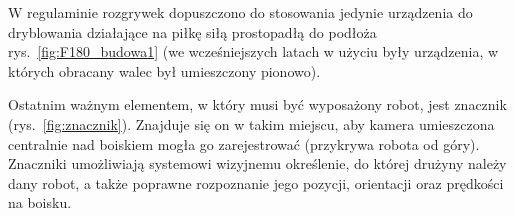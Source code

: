 	W regulaminie rozgrywek dopuszczono do stosowania jedynie urządzenia do dryblowania działające na piłkę siłą prostopadłą do podłoża rys.~\ref{fig:F180_budowa1} (we wcześniejszych latach
	w użyciu były  urządzenia, w których obracany walec był umieszczony pionowo).

	Ostatnim ważnym elementem, w który musi być wyposażony robot, jest znacznik (rys.~\ref{fig:znacznik}).
	Znajduje się on w takim miejscu, aby kamera umieszczona centralnie nad boiskiem mogła go zarejestrować (przykrywa robota od góry).
	Znaczniki umożliwiają systemowi wizyjnemu określenie, do której drużyny należy dany robot, a także poprawne rozpoznanie jego pozycji, orientacji oraz prędkości
	na boisku.

